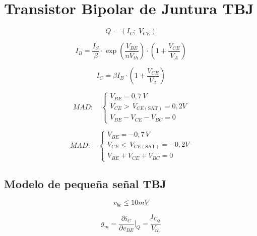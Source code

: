 \section{Transistor Bipolar de Juntura TBJ}
\begin{equation}
    Q = (I_C;\; V_{CE})
\end{equation}

\begin{equation}
    I_B = \frac{I_S}{\beta} \cdot \exp{\left(\frac{V_{BE}}{nV_{th}}\right)}\cdot \left( 1 + \frac{V_{CE}}{V_A} \right)
\end{equation}

\begin{equation}
    I_C = \beta I_B \cdot \left( 1 + \frac{V_{CE}}{V_A} \right)
\end{equation}


\begin{equation}
MAD: \quad \begin{cases}
V_{BE} = 0,7 \, V \\
V_{CE} > \, V_{CE(\text{SAT})} = 0,2 V \\
V_{BE} - V_{CE} - V_{BC} = 0
\end{cases}
\end{equation}

\begin{equation}
MAD: \quad \begin{cases}
V_{BE} = -0,7 \, V \\
V_{CE} < \, V_{CE(\text{SAT})} = -0,2 V \\
V_{BE} + V_{CE} + V_{BC} = 0
\end{cases}
\end{equation}

\subsection{Modelo de pequeña señal TBJ}

\begin{equation}
    v_{be} \leq 10mV
\end{equation}

\begin{equation}
    g_m = \frac{\partial i_C}{\partial v_{BE}} \Bigg|_Q = \frac{I_{C_Q}}{V_{th}}
\end{equation}

